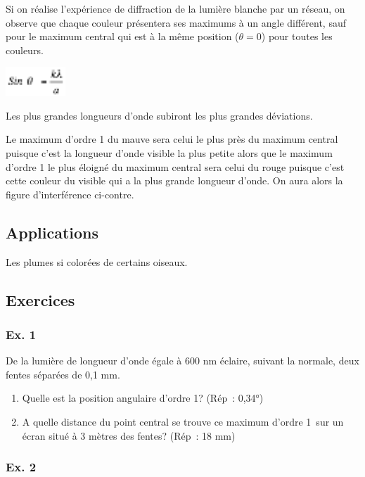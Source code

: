 Si on réalise l'expérience de diffraction de la lumière blanche par un
réseau, on observe que chaque couleur présentera ses maximums à un angle
différent, sauf pour le maximum central qui est à la même position ($\theta =
0$) pour toutes les couleurs.

\includegraphics[width=2.259cm,height=1.082cm]{Pictures/100000010000002C0000001558E0CCA95D4F59EB.png}

Les plus grandes longueurs d'onde subiront les plus grandes déviations.

Le maximum d'ordre 1 du mauve sera celui le plus près du
maximum central puisque c'est la longueur d'onde visible la plus petite
alors que le maximum d'ordre 1 le plus éloigné du maximum
central sera celui du rouge puisque c'est cette couleur du visible qui
a la plus grande longueur d'onde. On aura alors la figure d'interférence
ci-contre.

\subsection{Applications}

Les plumes si colorées de certains oiseaux.

\subsection{Exercices}

\subsubsection{Ex. 1}

De la lumière de longueur d'onde égale à 600 nm éclaire, suivant la
normale, deux fentes séparées de 0,1 mm.

\begin{enumerate}
\item  Quelle est la position angulaire d'ordre 1? (Rép~: 0,34°)
\item  A quelle distance du point central se trouve ce maximum d'ordre 1~sur
  un écran situé à 3 mètres des fentes? (Rép~: 18 mm)
\end{enumerate}

\subsubsection{Ex. 2}

